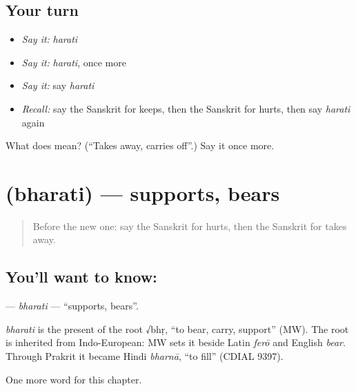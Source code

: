 \subsection*{Your turn}
\begin{itemize}
\raggedright
  \item \emph{Say it:} \emph{harati}
  \item \emph{Say it:} \emph{harati}, once more
  \item \emph{Say it:} say \emph{harati}
  \item \emph{Recall:} say the Sanskrit for keeps, then the Sanskrit for hurts, then say \emph{harati} again
\end{itemize}

\begin{tcolorbox}[breakable,colback=teal!4,colframe=teal!35!black,title={Before you move on}]
What does  mean? (\textquotedblleft{}Takes away, carries off\textquotedblright{}.) Say it once more.
\end{tcolorbox}
\section[\texorpdfstring{\sk{भरति} (bharati)}{भरति (bharati)}]{ (bharati) — supports, bears}

\label{lesson:SA-C175-bharati}



\begin{quote}
Before the new one: say the Sanskrit for hurts, then the Sanskrit for takes away.
\end{quote}

\subsection*{You'll want to know: }
\textbf{} — \emph{bharati} — \textquotedblleft{}supports, bears\textquotedblright{}.

\begin{cousinweb}
\emph{bharati} is the present of the root √bhṛ, \textquotedblleft{}to bear, carry, support\textquotedblright{} (MW). The root is inherited from Indo-European: MW sets it beside Latin \emph{ferō} and English \emph{bear}. Through Prakrit it became Hindi \emph{bharnā}, \textquotedblleft{}to fill\textquotedblright{} (CDIAL 9397).
\end{cousinweb}

\begin{grammarlens}[title={What you've built}]
One more word for this chapter.
\end{grammarlens}

